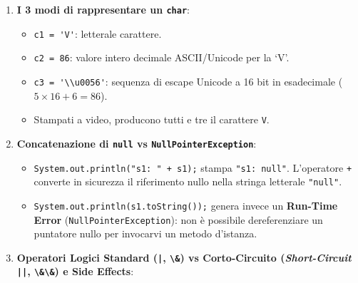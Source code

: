 \documentclass[11pt,a4paper]{article}
\newcommand{\passthrough}[1]{#1}
\providecommand{\tightlist}{\setlength{\itemsep}{0pt}\setlength{\parskip}{0pt}}
\begin{document}
\begin{enumerate}
  \begin{itemize}
  \tightlist
  \item
    \passthrough{\lstinline!static final double PI = 3.14;!}: la keyword
    \passthrough{\lstinline!final!} rende la variabile a sola lettura
    dopo l'inizializzazione. Il tentativo di riassegnamento
    \passthrough{\lstinline!PI = 3.0;!} viene respinto dal compilatore
    (\passthrough{\lstinline!cannot assign a value to final variable PI!}).
    Per convenzione Java, le costanti
    \passthrough{\lstinline!static final!} si scrivono in
    \passthrough{\lstinline!MAIUSCOLO\_SNAKE\_CASE!}.
  \end{itemize}
\item
  \textbf{I 3 modi di rappresentare un \passthrough{\lstinline!char!}}:

  \begin{itemize}
  \tightlist
  \item
    \passthrough{\lstinline!c1 = 'V'!}: letterale carattere.
  \item
    \passthrough{\lstinline!c2 = 86!}: valore intero decimale
    ASCII/Unicode per la `V'.
  \item
    \passthrough{\lstinline!c3 = '\\u0056'!}: sequenza di escape Unicode
    a 16 bit in esadecimale (\(5 \times 16 + 6 = 86\)).
  \item
    Stampati a video, producono tutti e tre il carattere
    \passthrough{\lstinline!V!}.
  \end{itemize}
\item
  \textbf{Concatenazione di \passthrough{\lstinline!null!} vs
  \passthrough{\lstinline!NullPointerException!}}:

  \begin{itemize}
  \tightlist
  \item
    \passthrough{\lstinline!System.out.println("s1: " + s1);!} stampa
    \passthrough{\lstinline!"s1: null"!}. L'operatore
    \passthrough{\lstinline!+!} converte in sicurezza il riferimento
    nullo nella stringa letterale \passthrough{\lstinline!"null"!}.
  \item
    \passthrough{\lstinline!System.out.println(s1.toString());!} genera
    invece un \textbf{Run-Time Error}
    (\passthrough{\lstinline!NullPointerException!}): non è possibile
    dereferenziare un puntatore nullo per invocarvi un metodo d'istanza.
  \end{itemize}
\item
  \textbf{Operatori Logici Standard (\passthrough{\lstinline!|!},
  \passthrough{\lstinline!\&!}) vs Corto-Circuito (\emph{Short-Circuit}
  \passthrough{\lstinline!||!}, \passthrough{\lstinline!\&\&!}) e Side
  Effects}:


\end{enumerate}
\end{document}
